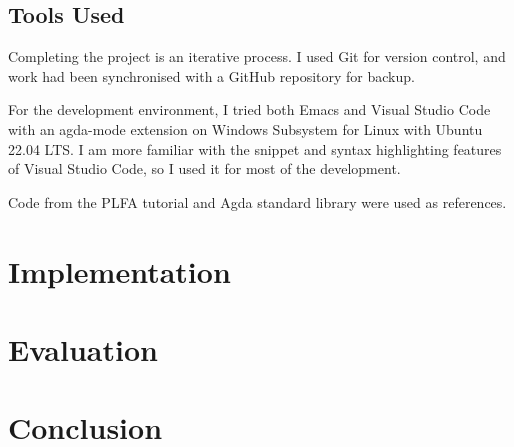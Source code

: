 \documentclass[12pt,twoside,a4paper]{report}
\theoremstyle{definition}
\begin{document}
    \section{Tools Used}
    Completing the project is an iterative process. I used Git \cite{git} for version control, and work had been synchronised with a GitHub \cite{github} repository for backup.

    For the development environment, I tried both Emacs \cite{emacs} and Visual Studio Code \cite{vscode} with an agda-mode extension \cite{agda_mode} on Windows Subsystem for Linux with Ubuntu \cite{wsl_ubuntu} 22.04 LTS. I am more familiar with the snippet and syntax highlighting features of Visual Studio Code, so I used it for most of the development. 

    Code from the PLFA tutorial and Agda standard library \cite{agda_std} were used as references. 

\chapter{Implementation}

\chapter{Evaluation}

\chapter{Conclusion}

    \printbibliography
\end{document}
